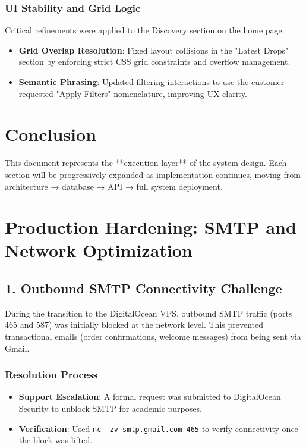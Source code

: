 \documentclass[12pt,a4paper]{article}
\begin{document}
\subsubsection{UI Stability and Grid Logic}

Critical refinements were applied to the Discovery section on the home page:

\begin{itemize}
    \item \textbf{Grid Overlap Resolution}: Fixed layout collisions in the "Latest Drops" section by enforcing strict CSS grid constraints and overflow management.
    \item \textbf{Semantic Phrasing}: Updated filtering interactions to use the customer-requested "Apply Filters" nomenclature, improving UX clarity.
\end{itemize}

\section{Conclusion}
This document represents the **execution layer** of the system design.
Each section will be progressively expanded as implementation continues, moving from architecture → database → API → full system deployment.

\section{Production Hardening: SMTP and Network Optimization}

\subsection{1. Outbound SMTP Connectivity Challenge}

During the transition to the DigitalOcean VPS, outbound SMTP traffic (ports 465 and 587) was initially blocked at the network level. This prevented transactional emails (order confirmations, welcome messages) from being sent via Gmail.

\subsubsection{Resolution Process}
\begin{itemize}
    \item \textbf{Support Escalation}: A formal request was submitted to DigitalOcean Security to unblock SMTP for academic purposes.
    \item \textbf{Verification}: Used \texttt{nc -zv smtp.gmail.com 465} to verify connectivity once the block was lifted.
\end{itemize}
\end{document}
